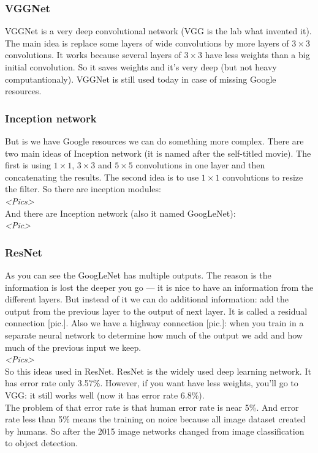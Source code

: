 \subsubsection*{VGGNet}

VGGNet is a very deep convolutional network (VGG is the lab what invented it). The main idea is replace some layers of wide convolutions by more layers of $3\times3$ convolutions. It works because several layers of $3\times3$ have less weights than a big initial convolution. So it saves weights and it's very deep (but not heavy computantionaly). VGGNet is still used today in case of missing Google resources.

\subsubsection*{Inception network}

But is we have Google resources we can do something more complex. There are two main ideas of Inception network (it is named after the self-titled movie). The first is using $1\times1$, $3\times3$ and $5\times5$ convolutions in one layer and then concatenating the results. The second idea is to use $1\times1$ convolutions to resize the filter. {\it <How it resizes filters>} So there are inception modules:\\
{\it <Pics>}\\
And there are Inception network (also it named GoogLeNet):\\
{\it <Pic>}

\subsubsection*{ResNet}

As you can see the GoogLeNet has multiple outputs. The reason is the information is lost the deeper you go --- it is nice to have an information from the different layers. But instead of it we can do additional information: add the output from the previous layer to the output of next layer. It is called a residual connection [pic.]. Also we have a highway connection [pic.]: when you train in a separate neural network to determine how much of the output we add and how much of the previous input we keep.\\
{\it <Pics>}\\
So this ideas used in ResNet. ResNet is the widely used deep learning network. It has error rate only 3.57\%. However, if you want have less weights, you'll go to VGG: it still works well (now it has error rate 6.8\%).\\
The problem of that error rate is that human error rate is near 5\%. And error rate less than 5\% means the training on noice because all image dataset created by humans. So after the 2015 image networks changed from image classification to object detection.

